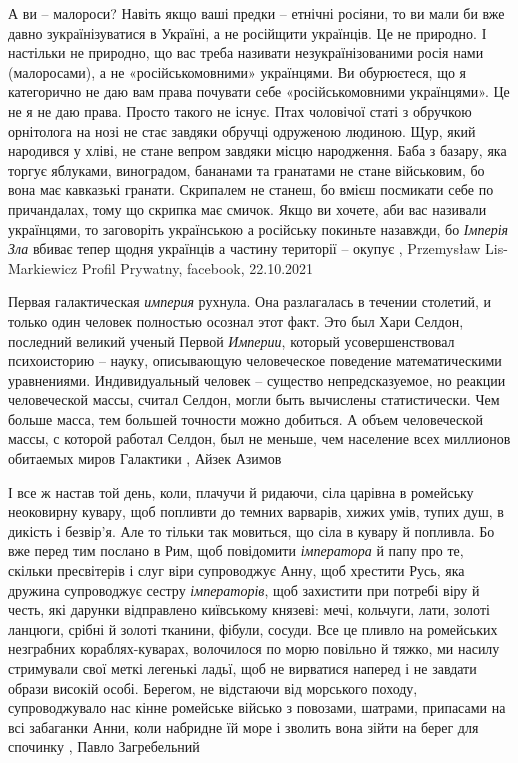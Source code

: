 А ви – малороси? Навіть якщо ваші предки – етнічні росіяни, то ви мали би вже
давно зукраїнізуватися в Україні, а не російщити українців. Це не природно. І
настільки не природно, що вас треба називати незукраїнізованими росія­ нами
(малоросами), а не «російськомовними» українцями. Ви обурюєтеся, що я
категорично не даю вам права почувати себе «російськомовними українцями». Це
не я не даю права. Просто такого не існує. Птах чоловічої статі з обручкою
орнітолога на нозі не стає завдяки обручці одруженою людиною. Щур, який
народився у хліві, не стане вепром завдяки місцю народження. Баба з базару, яка
торгує яблуками, виноградом, бананами та гранатами не стане військовим, бо вона
має кавказькі гранати. Скрипалем не станеш, бо вмієш посмикати себе по
причандалах, тому що скрипка має смичок. Якщо ви хочете, аби вас називали
українцями, то заговоріть українською а російську покиньте назавжди, бо
\emph{Імперія Зла} вбиває тепер щодня українців а частину території – окупує
, Przemysław Lis-Markiewicz Profil Prywatny, %
facebook, 22.10.2021

Первая галактическая \emph{империя} рухнула. Она разлагалась в течении
столетий, и только один человек полностью осознал этот факт.  Это был Хари
Селдон, последний великий ученый Первой \emph{Империи}, который
усовершенствовал психоисторию – науку, описывающую человеческое поведение
математическими уравнениями.  Индивидуальный человек – существо
непредсказуемое, но реакции человеческой массы, считал Селдон, могли быть
вычислены статистически.  Чем больше масса, тем большей точности можно
добиться. А объем человеческой массы, с которой работал Селдон, был не меньше,
чем население всех миллионов обитаемых миров Галактики
, Айзек Азимов

І все ж настав той день, коли, плачучи й ридаючи, сіла царівна в ромейську
неоковирну кувару, щоб попливти до темних варварів, хижих умів, тупих душ, в
дикість і безвір’я. Але то тільки так мовиться, що сіла в кувару й попливла.
Бо вже перед тим послано в Рим, щоб повідомити \emph{імператора} й папу про те,
скільки пресвітерів і слуг віри супроводжує Анну, щоб хрестити Русь, яка
дружина супроводжує сестру \emph{імператорів}, щоб захистити при потребі віру й
честь, які дарунки відправлено київському князеві: мечі, кольчуги, лати,
золоті ланцюги, срібні й золоті тканини, фібули, сосуди.
Все це пливло на ромейських незграбних кораблях-куварах, волочилося по морю
повільно й тяжко, ми насилу стримували свої меткі легенькі ладьї, щоб не
вирватися наперед і не завдати образи високій особі. Берегом, не відстаючи від
морського походу, супроводжувало нас кінне ромейське військо з повозами,
шатрами, припасами на всі забаганки Анни, коли набридне їй море і зволить вона
зійти на берег для спочинку
, Павло Загребельний 

